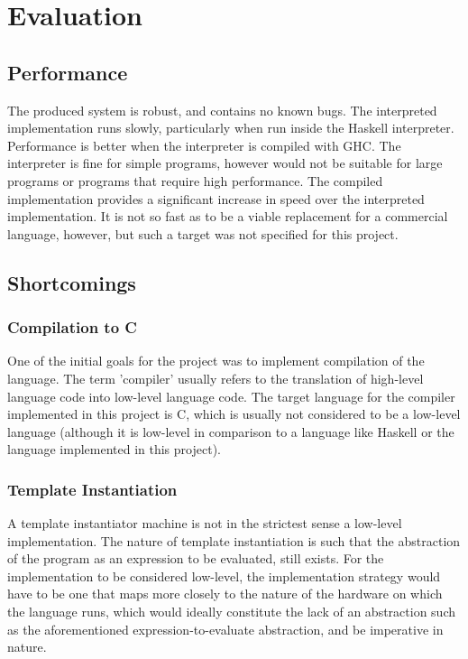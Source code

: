 \documentclass{article}
\begin{document}
\section{Evaluation}
\subsection{Performance}
The produced system is robust, and contains no known bugs. The interpreted implementation runs slowly, particularly when run inside the Haskell interpreter. Performance is better when the interpreter is compiled with GHC. The interpreter is fine for simple programs, however would not be suitable for large programs or programs that require high performance. The compiled implementation provides a significant increase in speed over the interpreted implementation. It is not so fast as to be a viable replacement for a commercial language, however, but such a target was not specified for this project.
\subsection{Shortcomings}
\subsubsection{Compilation to C}
One of the initial goals for the project was to implement compilation of the language. The term 'compiler' usually refers to the translation of high-level language code into low-level language code. The target language for the compiler implemented in this project is C, which is usually not considered to be a low-level language (although it is low-level in comparison to a language like Haskell or the language implemented in this project).
\subsubsection{Template Instantiation}
A template instantiator machine is not in the strictest sense a low-level implementation. The nature of template instantiation is such that the abstraction of the program as an expression to be evaluated, still exists. For the implementation to be considered low-level, the implementation strategy would have to be one that maps more closely to the nature of the hardware on which the language runs, which would ideally constitute the lack of an abstraction such as the aforementioned expression-to-evaluate abstraction, and be imperative in nature.

\end{document}
